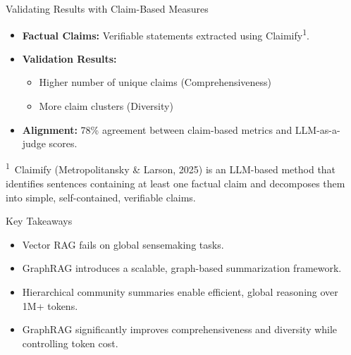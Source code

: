\documentclass[aspectratio=169,xcolor=dvipsnames]{beamer}
\begin{document}
	\begin{frame}{Validating Results with Claim-Based Measures}
		
		\begin{itemize}
			\item \textbf{Factual Claims:} Verifiable statements extracted using Claimify\textsuperscript{1}.
			
			\item \textbf{Validation Results:}
			\begin{itemize}
				\item Higher number of unique claims (Comprehensiveness)
				\item More claim clusters (Diversity)
			\end{itemize}
			
			\item \textbf{Alignment:} 78\% agreement between claim-based metrics and LLM-as-a-judge scores.
		\end{itemize}
		
		\vfill
		{\tiny
			\textsuperscript{1}\,
			Claimify (Metropolitansky \& Larson, 2025) is an LLM-based method that identifies
			sentences containing at least one factual claim and decomposes them into simple,
			self-contained, verifiable claims.
		}
		
	\end{frame}
	
	\begin{frame}{Key Takeaways}
		
		\begin{itemize}
			\item Vector RAG fails on global sensemaking tasks.
			
			\item GraphRAG introduces a scalable, graph-based summarization framework.
			
			\item Hierarchical community summaries enable efficient, global reasoning over 1M+ tokens.
			
			\item GraphRAG significantly improves comprehensiveness and diversity while controlling token cost.
		\end{itemize}
		
	\end{frame}
	
\end{document}
